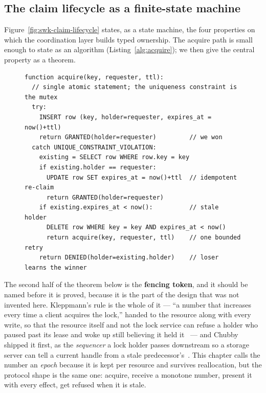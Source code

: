 \documentclass[11pt,a4paper]{article}
\theoremstyle{definition}
\theoremstyle{remark}
\begin{document}
\subsection{The claim lifecycle as a finite-state machine}

Figure~\ref{fig:swk-claim-lifecycle} states, as a state machine, the four
properties on which the coordination layer builds typed ownership. The acquire
path is small enough to state as an algorithm (Listing~\ref{alg:acquire}); we
then give the central property as a theorem.
\begin{figure}[H]
\centering
\begin{minipage}{0.92\textwidth}
\lstset{style=pseudocode}
\begin{lstlisting}[caption={Claim acquisition. The whole acquire is a single
insert against a uniqueness constraint; the loser is handed the current holder,
not an error to retry blindly.},label={alg:acquire},captionpos=b]
function acquire(key, requester, ttl):
  // single atomic statement; the uniqueness constraint is the mutex
  try:
    INSERT row (key, holder=requester, expires_at = now()+ttl)
    return GRANTED(holder=requester)         // we won
  catch UNIQUE_CONSTRAINT_VIOLATION:
    existing = SELECT row WHERE row.key = key
    if existing.holder == requester:
      UPDATE row SET expires_at = now()+ttl  // idempotent re-claim
      return GRANTED(holder=requester)
    if existing.expires_at < now():          // stale holder
      DELETE row WHERE key = key AND expires_at < now()
      return acquire(key, requester, ttl)    // one bounded retry
    return DENIED(holder=existing.holder)    // loser learns the winner
\end{lstlisting}
\end{minipage}
\end{figure}
The second half of the theorem below is the \textbf{fencing token}, and it should
be named before it is proved, because it is the part of the design that was not
invented here. Kleppmann's rule is the whole of it --- ``a number that increases
every time a client acquires the lock,'' handed to the resource along with every
write, so that the resource itself and not the lock service can refuse a holder
who paused past its lease and woke up still believing it held
it~ --- and Chubby shipped it first, as the
\emph{sequencer} a lock holder passes downstream so a storage server can tell a
current handle from a stale predecessor's~. This
chapter calls the number an \emph{epoch} because it is kept per resource and
survives reallocation, but the protocol shape is the same one: acquire, receive
a monotone number, present it with every effect, get refused when it is stale.
\end{document}

